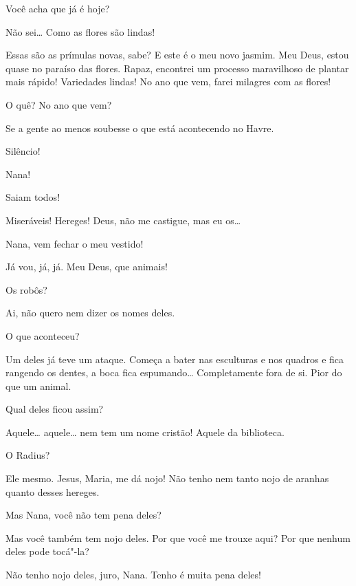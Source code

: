   Você acha que já é hoje?

 Não sei\ldots{} Como as flores são lindas!

  Essas são as prímulas novas, sabe? E este é o
meu novo jasmim. Meu Deus, estou quase no paraíso das flores. Rapaz, encontrei
um processo maravilhoso de plantar mais rápido! Variedades lindas! No ano que
vem, farei milagres com as flores!

  O quê? No ano que vem?

 Se a gente ao menos soubesse o que está acontecendo no Havre.

 Silêncio!

  Nana!

 Saiam todos! 

  Miseráveis! Hereges! Deus, não me
castigue, mas eu os\ldots{}

  Nana, vem fechar o meu vestido!

 Já vou, já, já.  Meu Deus, que animais!

 Os robôs?

 Ai, não quero nem dizer os nomes deles.

 O que aconteceu?

 Um deles já teve um ataque. Começa a bater nas esculturas e nos quadros e
fica rangendo os dentes, a boca fica espumando\ldots{} Completamente fora de si.
Pior do que um animal.

 Qual deles ficou assim?

 Aquele\ldots{} aquele\ldots{} nem tem um nome cristão! Aquele da biblioteca.

 O Radius?

 Ele mesmo. Jesus, Maria, me dá nojo! Não tenho nem tanto nojo de aranhas
quanto desses hereges.

 Mas Nana, você não tem pena deles?

 Mas você também tem nojo deles. Por que você me trouxe aqui? Por que
nenhum deles pode tocá"-la?

 Não tenho nojo deles, juro, Nana. Tenho é muita pena deles!

